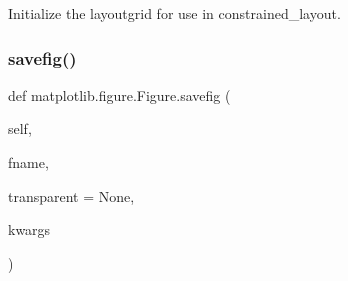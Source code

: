 \begin{DoxyVerb}Initialize the layoutgrid for use in constrained_layout.\end{DoxyVerb}
 \mbox{\label{classmatplotlib_1_1figure_1_1Figure_a2d305a2a362c405320b0725a8c02c5b2}} 
\subsubsection{\texorpdfstring{savefig()}{savefig()}}
{\footnotesize\ttfamily def matplotlib.\+figure.\+Figure.\+savefig (\begin{DoxyParamCaption}\item[{}]{self,  }\item[{}]{fname,  }\item[{}]{transparent = {\ttfamily None},  }\item[{}]{kwargs }\end{DoxyParamCaption})}

